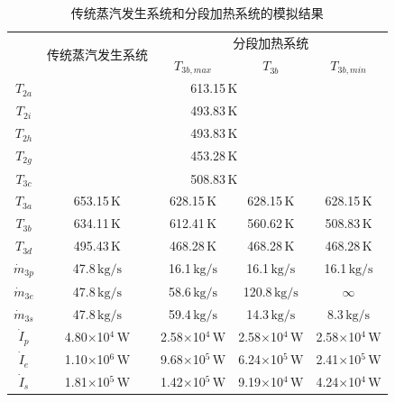 \begin{table}[t!]
\setlength{\abovecaptionskip}{0pt}
	\caption{传统蒸汽发生系统和分段加热系统的模拟结果}
	\centering
	\begin{tabular}{ccccc}
		\toprule
		& \multirow{2}{*}{传统蒸汽发生系统} & \multicolumn{3}{c}{分段加热系统}\\\cline{3-5}
 &  & $T_{3b,max}$ & $T_{3b}$ & $T_{3b,min}$\\
		\midrule
		$T_{2a}$ & \multicolumn{4}{c}{613.15$\,\mathrm{K}$}\\
		$T_{2i}$ & \multicolumn{4}{c}{493.83$\,\mathrm{K}$}\\
		$T_{2h}$ & \multicolumn{4}{c}{493.83$\,\mathrm{K}$}\\
		$T_{2g}$ & \multicolumn{4}{c}{453.28$\,\mathrm{K}$}\\
		$T_{3c}$ & \multicolumn{4}{c}{508.83$\,\mathrm{K}$}\\
		$T_{3a}$	&	653.15$\,\mathrm{K}$
	&	628.15$\,\mathrm{K}$	&	628.15$\,\mathrm{K}$	&	628.15$\,\mathrm{K}$\\
		$T_{3b}$	&	634.11$\,\mathrm{K}$	&	612.41$\,\mathrm{K}$	&	560.62$\,\mathrm{K}$	&	508.83$\,\mathrm{K}$\\
		$T_{3d}$	&	495.43$\,\mathrm{K}$
	&	468.28$\,\mathrm{K}$	&	468.28$\,\mathrm{K}$	&	468.28$\,\mathrm{K}$\\
		$\dot{m}_{3p}$	&	47.8$\,\mathrm{kg/s}$	&	16.1$\,\mathrm{kg/s}$	&	16.1$\,\mathrm{kg/s}$	&	16.1$\,\mathrm{kg/s}$\\
		$\dot{m}_{3e}$	&	47.8$\,\mathrm{kg/s}$	&	58.6$\,\mathrm{kg/s}$	&	120.8$\,\mathrm{kg/s}$	&	$\infty$\\
		$\dot{m}_{3s}$	&	47.8$\,\mathrm{kg/s}$	&	59.4$\,\mathrm{kg/s}$	&	14.3$\,\mathrm{kg/s}$	&	8.3$\,\mathrm{kg/s}$\\
		$\dot{I}_p$    &    4.80$\times$10$^4\,\mathrm{W}$    	&  2.58$\times$10$^4\,\mathrm{W}$  &	2.58$\times$10$^4\,\mathrm{W}$	&	2.58$\times$10$^4\,\mathrm{W}$\\
		$\dot{I}_e$    &    1.10$\times$10$^6\,\mathrm{W}$    	&  9.68$\times$10$^5\,\mathrm{W}$  &	6.24$\times$10$^5\,\mathrm{W}$	&	2.41$\times$10$^5\,\mathrm{W}$	\\
		$\dot{I}_s$    &    1.81$\times$10$^5\,\mathrm{W}$    	&  1.42$\times$10$^5\,\mathrm{W}$  &	9.19$\times$10$^4\,\mathrm{W}$	&	4.24$\times$10$^4\,\mathrm{W}$\\

\end{tabular}
\end{table}
